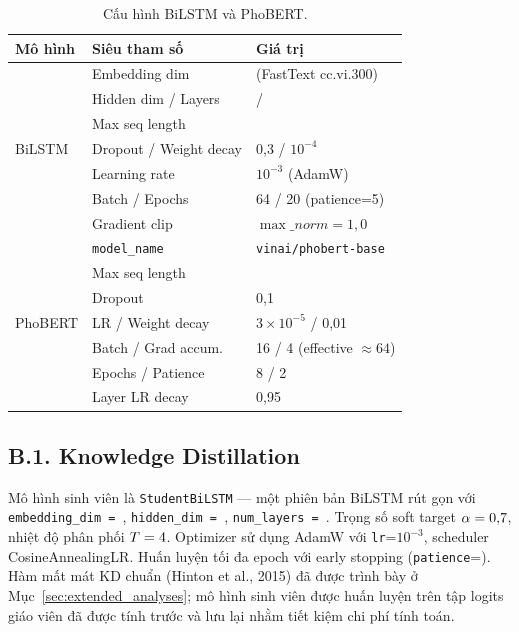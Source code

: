 \begin{table}[H]
  \centering
  \small
  \caption[Cấu hình BiLSTM và PhoBERT]{Cấu hình BiLSTM và PhoBERT.}
  \label{tab:appendix_dl}
  \begin{tabular}{l l l}
    \toprule
    \textbf{Mô hình} & \textbf{Siêu tham số} & \textbf{Giá trị} \\
    \midrule
    \multirow{7}{*}{BiLSTM}
      & Embedding dim            & \bilstmembdim{} (FastText cc.vi.300) \\
      & Hidden dim / Layers      & \bilstmhiddendim{} / \bilstmlayers{} \\
      & Max seq length           & \bilstmmaxseq{} \\
      & Dropout / Weight decay   & 0{,}3 / $10^{-4}$ \\
      & Learning rate            & $10^{-3}$ (AdamW) \\
      & Batch / Epochs           & 64 / 20 (patience=5) \\
      & Gradient clip            & $\max\_norm = 1{,}0$ \\
    \midrule
    \multirow{7}{*}{PhoBERT}
      & \texttt{model\_name}     & \texttt{vinai/phobert-base} \\
      & Max seq length           & \phobertmaxseq{} \\
      & Dropout                  & 0{,}1 \\
      & LR / Weight decay        & $3 \times 10^{-5}$ / 0{,}01 \\
      & Batch / Grad accum.      & 16 / 4 (effective $\approx 64$) \\
      & Epochs / Patience        & 8 / 2 \\
      & Layer LR decay           & 0{,}95 \\
    \bottomrule
  \end{tabular}
\end{table}

\subsection*{B.1. Knowledge Distillation}

Mô hình sinh viên là \texttt{StudentBiLSTM} --- một phiên bản BiLSTM rút gọn với \texttt{embedding\_dim = \studentembdim{}}, \texttt{hidden\_dim = \studenthiddim{}}, \texttt{num\_layers = \studentlayers{}}. Trọng số soft target $\alpha = 0{,}7{}$, nhiệt độ phân phối $T = 4{}$. Optimizer sử dụng AdamW với \texttt{lr}=$10^{-3}$, scheduler CosineAnnealingLR. Huấn luyện tối đa \studentepochs{} epoch với early stopping (\texttt{patience}=\studentpatience{}). Hàm mất mát KD chuẩn (Hinton et al., 2015) đã được trình bày ở Mục~\ref{sec:extended_analyses}; mô hình sinh viên được huấn luyện trên tập logits giáo viên đã được tính trước và lưu lại nhằm tiết kiệm chi phí tính toán.

